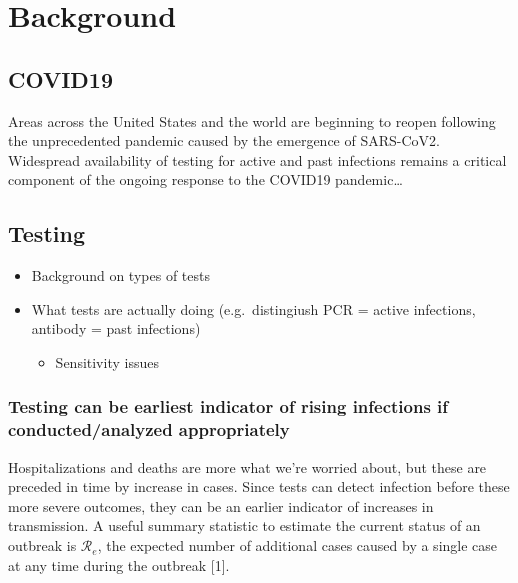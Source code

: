 \documentclass[
]{article}
\providecommand{\tightlist}{%
  \setlength{\itemsep}{0pt}\setlength{\parskip}{0pt}}
\begin{document}
\hypertarget{background}{%
\section{Background}\label{background}}

\hypertarget{covid19}{%
\subsection{COVID19}\label{covid19}}

Areas across the United States and the world are beginning to reopen
following the unprecedented pandemic caused by the emergence of
SARS-CoV2. Widespread availability of testing for active and past
infections remains a critical component of the ongoing response to the
COVID19 pandemic\ldots{}

\hypertarget{testing}{%
\subsection{Testing}\label{testing}}

\begin{itemize}
\tightlist
\item
  Background on types of tests\\
\item
  What tests are actually doing (e.g.~distingiush PCR = active
  infections, antibody = past infections)

  \begin{itemize}
  \tightlist
  \item
    Sensitivity issues
  \end{itemize}
\end{itemize}

\hypertarget{testing-can-be-earliest-indicator-of-rising-infections-if-conductedanalyzed-appropriately}{%
\subsubsection{Testing can be earliest indicator of rising infections if
conducted/analyzed
appropriately}\label{testing-can-be-earliest-indicator-of-rising-infections-if-conductedanalyzed-appropriately}}

Hospitalizations and deaths are more what we're worried about, but these
are preceded in time by increase in cases. Since tests can detect
infection before these more severe outcomes, they can be an earlier
indicator of increases in transmission. A useful summary statistic to
estimate the current status of an outbreak is \(\mathcal{R}_e\), the
expected number of additional cases caused by a single case at any time
during the outbreak {[}1{]}.
\end{document}
